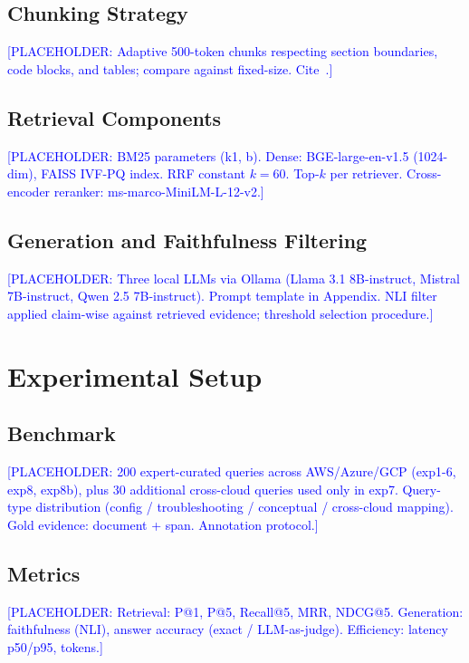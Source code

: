 \documentclass[conference]{IEEEtran}
\begin{document}
\subsection{Chunking Strategy}
\textcolor{blue}{[PLACEHOLDER: Adaptive 500-token chunks respecting section boundaries, code blocks, and tables; compare against fixed-size. Cite~\cite{mahmood2025azureiq,mahr2025shap,rahman2025techpdfs}.]}

\subsection{Retrieval Components}
\textcolor{blue}{[PLACEHOLDER: BM25 parameters (k1, b). Dense: BGE-large-en-v1.5 (1024-dim), FAISS IVF-PQ index. RRF constant $k=60$. Top-$k$ per retriever. Cross-encoder reranker: ms-marco-MiniLM-L-12-v2.]}

\subsection{Generation and Faithfulness Filtering}
\textcolor{blue}{[PLACEHOLDER: Three local LLMs via Ollama (Llama 3.1 8B-instruct, Mistral 7B-instruct, Qwen 2.5 7B-instruct). Prompt template in Appendix. NLI filter applied claim-wise against retrieved evidence; threshold selection procedure.]}

\section{Experimental Setup}
\label{sec:setup}

\subsection{Benchmark}
\textcolor{blue}{[PLACEHOLDER: 200 expert-curated queries across AWS/Azure/GCP (exp1-6, exp8, exp8b), plus 30 additional cross-cloud queries used only in exp7. Query-type distribution (config / troubleshooting / conceptual / cross-cloud mapping). Gold evidence: document + span. Annotation protocol.]}

\subsection{Metrics}
\textcolor{blue}{[PLACEHOLDER: Retrieval: P@1, P@5, Recall@5, MRR, NDCG@5. Generation: faithfulness (NLI), answer accuracy (exact / LLM-as-judge). Efficiency: latency p50/p95, tokens.]}
\end{document}
